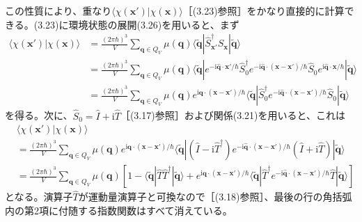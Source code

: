 この性質により、重なり$\langle\chi(\bm x')|\chi(\bm x)\rangle$［(3.23)参照］をかなり直接的に計算できる。(3.23)に環境状態の展開(3.26)を用いると、まず
\begin{equation}
\begin{aligned}
\langle\chi(\bm x')|\chi(\bm x)\rangle
&=\frac{(2\pi\hbar)^3}{V}\sum_{\bm q\in Q_V}\mu(\bm q)\langle\widetilde{\bm q}|\hat S_{\bm x'}^{\dagger}\hat S_{\bm x}|\widetilde{\bm q}\rangle\\
&=\frac{(2\pi\hbar)^3}{V}\sum_{\bm q\in Q_V}\mu(\bm q)\langle\widetilde{\bm q}|e^{-\mathrm i\hat{\bm q}\cdot\bm x'/\hbar}\hat S_0^{\dagger}
e^{-\mathrm i\hat{\bm q}\cdot(\bm x-\bm x')/\hbar}\hat S_0e^{\mathrm i\hat{\bm q}\cdot\bm x/\hbar}|\widetilde{\bm q}\rangle\\
&=\frac{(2\pi\hbar)^3}{V}\sum_{\bm q\in Q_V}\mu(\bm q)e^{\mathrm i\bm q\cdot(\bm x-\bm x')/\hbar}
\langle\widetilde{\bm q}|\hat S_0^{\dagger}e^{-\mathrm i\hat{\bm q}\cdot(\bm x-\bm x')/\hbar}\hat S_0|\widetilde{\bm q}\rangle
\end{aligned}\tag{3.27}
\end{equation}
を得る。次に、$\hat S_0=\hat I+\mathrm i\hat T$［(3.17)参照］および関係(3.21)を用いると、これは
\begin{equation}
\begin{aligned}
&\langle\chi(\bm x')|\chi(\bm x)\rangle\\
&=\frac{(2\pi\hbar)^3}{V}\sum_{\bm q\in Q_V}\mu(\bm q)e^{\mathrm i\bm q\cdot(\bm x-\bm x')/\hbar}
\langle\widetilde{\bm q}|(\hat I-\mathrm i\hat T^{\dagger})e^{-\mathrm i\hat{\bm q}\cdot(\bm x-\bm x')/\hbar}(\hat I+\mathrm i\hat T)|\widetilde{\bm q}\rangle\\
&=\frac{(2\pi\hbar)^3}{V}\sum_{\bm q\in Q_V}\mu(\bm q)
\left[1-\langle\widetilde{\bm q}|\hat T\hat T^{\dagger}|\widetilde{\bm q}\rangle
+e^{\mathrm i\bm q\cdot(\bm x-\bm x')/\hbar}\langle\widetilde{\bm q}|\hat T^{\dagger}e^{-\mathrm i\hat{\bm q}\cdot(\bm x-\bm x')/\hbar}\hat T|\widetilde{\bm q}\rangle\right]
\end{aligned}\tag{3.28}
\end{equation}
となる。演算子$\hat T$が運動量演算子と可換なので［(3.18)参照］、最後の行の角括弧内の第2項に付随する指数関数はすべて消えている。

